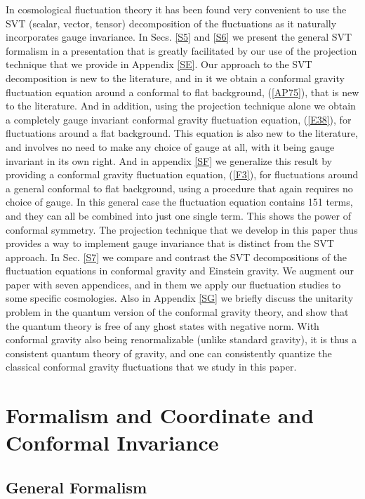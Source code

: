 \documentclass[aps]{revtex4}
\begin{document}
In cosmological fluctuation theory it has been found very convenient to use the SVT (scalar, vector, tensor) decomposition of the fluctuations as it naturally incorporates gauge invariance. In Secs. \ref{S5} and \ref{S6} we present the general SVT formalism in a presentation that is greatly facilitated by our use of the projection technique that we provide in Appendix \ref{SE}. Our approach to the SVT decomposition is new to the literature, and in it we obtain a conformal gravity fluctuation equation around a conformal to flat background, (\ref{AP75}), that is new to the literature. And in addition, using the projection technique alone we obtain a completely gauge invariant conformal gravity fluctuation equation, (\ref{E38}), for fluctuations around a flat background. This equation is also new to the literature, and involves no need to make any choice of gauge at all, with it being gauge invariant in its own right. And in appendix \ref{SF} we generalize this result by providing a conformal gravity fluctuation equation, (\ref{F3}), for fluctuations around a general conformal to flat background, using a procedure that again requires no choice of gauge. In this general case the fluctuation equation contains 151 terms, and they can all be combined into just one single term. This shows the power of conformal symmetry. The projection technique that we develop in this paper thus provides a way to implement gauge invariance that is distinct from the SVT approach. In Sec. \ref{S7} we compare and contrast the SVT decompositions of  the fluctuation equations in conformal gravity and Einstein gravity. We augment our paper with seven appendices, and in them we apply our fluctuation studies to some specific cosmologies. Also in Appendix \ref{SG} we briefly discuss the unitarity problem in the quantum version of the conformal gravity theory, and show that the quantum theory is free of any ghost states with negative norm. With conformal gravity also being renormalizable (unlike standard gravity), it is thus a consistent quantum theory of gravity, and one can consistently quantize the classical conformal gravity fluctuations that we study in this paper.

\section{Formalism and Coordinate and Conformal Invariance}
\label{S2}

\subsection{General Formalism}
\end{document}
